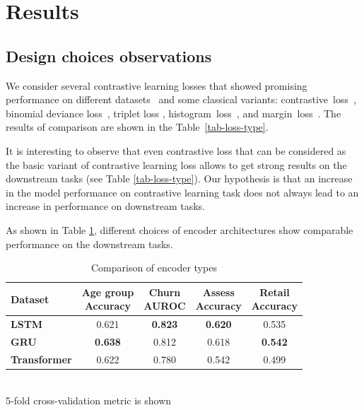 \documentclass[sigconf]{acmart}
\begin{document}
\section{Results} \label{app-sec-res}

\subsection{Design choices observations} \label{app-sec-design}

We consider several contrastive learning losses that showed promising performance on different datasets~\citep{Kaya2019DeepML} and some classical variants: contrastive~loss~\citep{Hadsell2006DimensionalityRB}, binomial deviance loss~\citep{Yi2014DeepML}, triplet loss \citep{Hoffer2015DeepML}, histogram~loss~\citep{Ustinova2016LearningDE}, and margin~loss~\citep{Manmatha2017SamplingMI}. The results of comparison are shown in the Table~\ref{tab-loss-type}.

It is interesting to observe that even contrastive loss that can be considered as the basic variant of contrastive learning loss allows to get strong results on the downstream tasks (see Table \ref{tab-loss-type}). Our hypothesis is that an increase in the model performance on contrastive learning task does not always lead to an increase in performance on downstream tasks.

As shown in Table \ref{tab-enc-type}, different choices of encoder architectures show comparable performance on the downstream tasks.

\begin{table}
\centering
\caption{Comparison of encoder types}
\begin{tabular}{lcccc}

\toprule
\textbf{Dataset} &
\makecell{\textbf{Age group} \\ \small{Accuracy}} &
\makecell{\textbf{Churn} \\ \small{AUROC}} &
\makecell{\textbf{Assess} \\ \small{Accuracy}} &
\makecell{\textbf{Retail} \\ \small{Accuracy}} \\
\midrule

\textbf{LSTM} & 0.621 & \textbf{0.823} & \textbf{0.620} & 0.535 \\
\textbf{GRU} & \textbf{0.638} & 0.812 & 0.618 & \textbf{0.542} \\
\textbf{Transformer} & 0.622 & 0.780 & 0.542 & 0.499 \\

\bottomrule
\end{tabular} \\
\small{5-fold cross-validation metric is shown}
\label{tab-enc-type}
\end{table}
\end{document}
